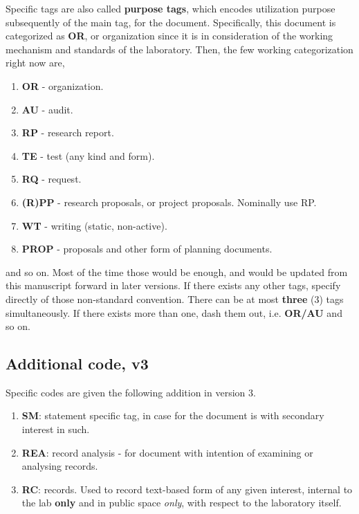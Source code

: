 \documentclass[9pt,a4paper]{article}
\begin{document}
Specific tags are also called \textbf{purpose tags}, which encodes utilization purpose subsequently of the main tag, for the document. Specifically, this document is categorized as \textbf{OR}, or organization since it is in consideration of the working mechanism and standards of the laboratory. Then, the few working categorization right now are,
\begin{enumerate}
    \item \textbf{OR} - organization. 
    \item \textbf{AU} - audit. 
    \item \textbf{RP} - research report. 
    \item \textbf{TE} - test (any kind and form). 
    \item \textbf{RQ} - request. 
    \item \textbf{(R)PP} - research proposals, or project proposals. Nominally use RP. 
    \item \textbf{WT} - writing (static, non-active). 
    \item \textbf{PROP} - proposals and other form of planning documents. 
\end{enumerate}
and so on. Most of the time those would be enough, and would be updated from this manuscript forward in later versions. If there exists any other tags, specify directly of those non-standard convention. There can be at most \textbf{three} (3) tags simultaneously. If there exists more than one, dash them out, i.e. \textbf{OR/AU} and so on. 

\subsection{Additional code, v3}

Specific codes are given the following addition in version 3. 

\begin{enumerate}
    \item \textbf{SM}: statement specific tag, in case for the document is with secondary interest in such. 
    \item \textbf{REA}: record analysis - for document with intention of examining or analysing records. 
    \item \textbf{RC}: records. Used to record text-based form of any given interest, internal to the lab \textbf{only} and in public space \textit{only}, with respect to the laboratory itself. 
\end{enumerate}
\end{document}
